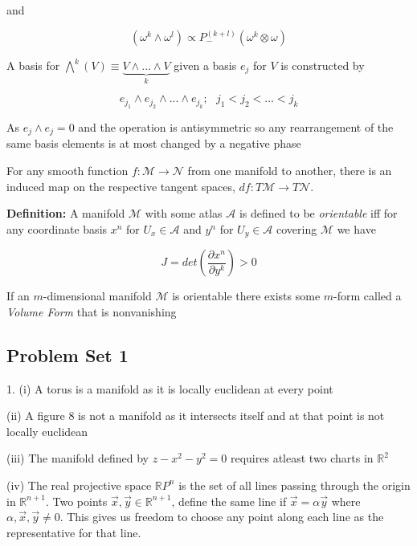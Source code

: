 \documentclass{article}\usepackage[]{graphicx}\usepackage[]{color}
\newcommand{\M}{\mathcal{M}}
\begin{document}
and 

$$ 
 (\omega^k\wedge\omega^l)\propto P^{(k+l)}_{-}(\omega^k\otimes\omega )
$$
 
A basis for $\bigwedge^{k}(V)\equiv \underbrace{ V\wedge ...\wedge V}_k$ given a basis $e
 _j$ for $V$ is constructed by

$$
e_{j_1}\wedge e_{j_2}\wedge... \wedge e_{j_k}; \ \ \ j_1 < j_2<...<j_k
$$

As $e_j\wedge e_j=0$ and the operation is antisymmetric so any rearrangement of the same basis elements is at most changed by a negative phase


For any smooth function $f:\M\rightarrow\mathcal{N}$ from one manifold to another, there is an induced map on the respective tangent spaces, $df:T\M\rightarrow T\mathcal{N}$.

\begin{center}



\end{center}

\textbf{Definition:} A manifold $\M$ with some atlas $\mathcal{A}$ is defined to be \textit{orientable} iff for any coordinate basis $x^n$ for $U_x \in\mathcal{A}$ and $y^n$ for $U_y \in\mathcal{A}$ covering $\M$ we have

$$
J=det\left( \frac{\partial x^n}{\partial y^k} \right)>0
$$ 
 
 
If an $m$-dimensional manifold $\M$ is orientable there exists some $m$-form called a \textit{Volume Form} that is nonvanishing  
 
\pagebreak



\subsection{Problem Set 1}


1. (i) A torus is a manifold as it is locally euclidean at every point

(ii) A figure 8 is not a manifold as it intersects itself and at that point is not locally euclidean 

(iii) The manifold defined by $z-x^2-y^2=0$ requires atleast two charts in $\mathbb{R}^2$

(iv) The real projective space $\mathbb{R}P^n$ is the set of all lines passing through the origin in $\mathbb{R}^{n+1}$. Two points $\vec{x},\vec{y}\in\mathbb{R}^{n+1}$, define the same line if $\vec{x}=\alpha\vec{y}$ where $\alpha,\vec{x},\vec{y}\neq 0$. This gives us freedom to choose any point along each line as the representative for that line. 
\end{document}
